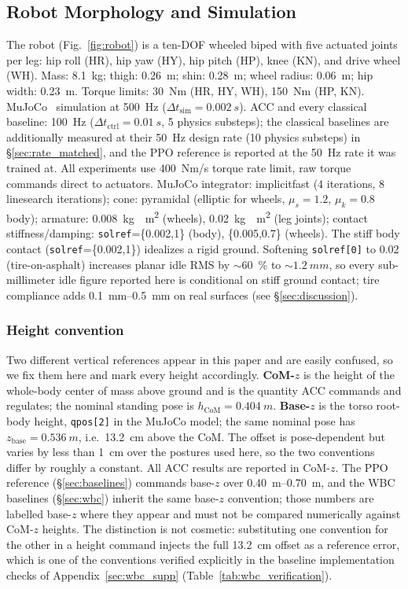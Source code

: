 \documentclass[conference]{IEEEtran}
\begin{document}
\subsection{Robot Morphology and Simulation}
The robot (Fig.~\ref{fig:robot}) is a ten-DOF wheeled biped with five actuated joints per leg: hip roll (HR), hip yaw (HY), hip pitch (HP), knee (KN), and drive wheel (WH).
Mass: \SI{8.1}{kg}; thigh: \SI{0.26}{m}; shin: \SI{0.28}{m}; wheel radius: \SI{0.06}{m}; hip width: \SI{0.23}{m}.
Torque limits: \SI{30}{Nm} (HR, HY, WH), \SI{150}{Nm} (HP, KN).
MuJoCo~\cite{mujoco} simulation at \SI{500}{Hz} ($\Delta t_{\text{sim}}=\SI{0.002}{s}$). ACC and every classical baseline: \SI{100}{Hz} ($\Delta t_{\text{ctrl}}=\SI{0.01}{s}$, \num{5} physics substeps); the classical baselines are additionally measured at their \SI{50}{Hz} design rate (\num{10} physics substeps) in \S\ref{sec:rate_matched}, and the PPO reference is reported at the \SI{50}{Hz} rate it was trained at. All experiments use \SI{400}{Nm/s} torque rate limit, raw torque commands direct to actuators. MuJoCo integrator: implicitfast (4 iterations, 8 linesearch iterations); cone: pyramidal (elliptic for wheels, $\mu_s{=}1.2$, $\mu_k{=}0.8$ body); armature: \SI{0.008}{kg{\cdot}m^2} (wheels), \SI{0.02}{kg{\cdot}m^2} (leg joints); contact stiffness/damping: \texttt{solref}=\{0.002,1\} (body), \{0.005,0.7\} (wheels).
The stiff body contact (\texttt{solref}=\{0.002,1\}) idealizes a rigid ground. Softening \texttt{solref[0]} to 0.02 (tire-on-asphalt) increases planar idle RMS by ${\sim}$\SI{60}{\percent} to ${\sim}\SI{1.2}{mm}$, so every sub-millimeter idle figure reported here is conditional on stiff ground contact; tire compliance adds \SIrange{0.1}{0.5}{mm} on real surfaces (see \S\ref{sec:discussion}).

\subsubsection*{Height convention}
\label{sec:height_convention}
Two different vertical references appear in this paper and are easily confused,
so we fix them here and mark every height accordingly.
\textbf{CoM-$z$} is the height of the whole-body center of mass above ground and
is the quantity ACC commands and regulates; the nominal standing pose is
$h_{\text{CoM}}{=}\SI{0.404}{m}$.
\textbf{Base-$z$} is the torso root-body height, \texttt{qpos[2]} in the MuJoCo
model; the same nominal pose has $z_{\text{base}}{=}\SI{0.536}{m}$, i.e.\
\SI{13.2}{cm} above the CoM.
The offset is pose-dependent but varies by less than \SI{1}{cm} over the
postures used here, so the two conventions differ by roughly a constant.
All ACC results are reported in CoM-$z$.
The PPO reference (\S\ref{sec:baselines}) commands base-$z$ over
\SIrange{0.40}{0.70}{m}, and the WBC baselines (\S\ref{sec:wbc}) inherit the
same base-$z$ convention; those numbers are labelled base-$z$ where they appear
and must not be compared numerically against CoM-$z$ heights.
The distinction is not cosmetic: substituting one convention for the other in a
height command injects the full \SI{13.2}{cm} offset as a reference error, which
is one of the conventions verified explicitly in the baseline implementation
checks of Appendix~\ref{sec:wbc_supp} (Table~\ref{tab:wbc_verification}).
\end{document}
